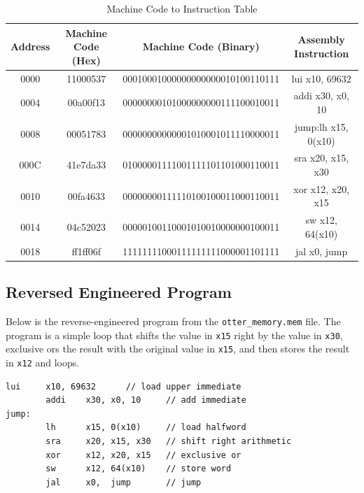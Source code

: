 \documentclass[
    a4paper, %
	12pt, %
    ]{CSSullivanBusinessReport}
\begin{document}
\begin{fullwidth}
\begin{table}[ htbp]
    \centering
    \footnotesize
    \captionsetup{style=widetable}
    \caption{Machine Code to Instruction Table}
    \begin{tabular}{|c|c|c|c|}
    \hline
    Address & Machine Code (Hex) & Machine Code (Binary) & Assembly Instruction  \\
    \hline
    \hline
        0000 & 11000537 & 00010001000000000000010100110111 & lui x10, 69632      \\
        \hline
        0004 & 00a00f13 & 00000000101000000000111100010011 & addi x30, x0, 10    \\
        \hline
        0008 & 00051783 & 00000000000001010001011110000011 & jump:lh x15, 0(x10) \\
        \hline
        000C & 41e7da33 & 01000001111001111101101000110011 & sra x20, x15, x30   \\
        \hline
        0010 & 00fa4633 & 00000000111110100100011000110011 & xor x12, x20, x15   \\
        \hline
        0014 & 04c52023 & 00000100110001010010000000100011 & sw x12, 64(x10)     \\
        \hline
        0018 & ff1ff06f & 11111111000111111111000001101111 & jal x0, jump        \\
    \hline
    \end{tabular}
    \label{tab:machineToInstruction}
\end{table}


\subsection{Reversed Engineered Program} %

Below is the reverse-engineered program from the \verb|otter_memory.mem| file. The program is a simple loop that shifts the value in \verb|x15| right by the value in \verb|x30|, exclusive ors the result with the original value in \verb|x15|, and then stores the result in \verb|x12| and loops.

\captionsetup{style=widetable}
\begin{lstlisting}[caption=Assembly instructions from reverse engineered file]
        lui     x10, 69632      // load upper immediate
        addi    x30, x0, 10     // add immediate
jump:       
        lh      x15, 0(x10)     // load halfword
        sra     x20, x15, x30   // shift right arithmetic
        xor     x12, x20, x15   // exclusive or
        sw      x12, 64(x10)    // store word
        jal     x0,  jump       // jump
\end{lstlisting}


\end{fullwidth}
\end{document}
